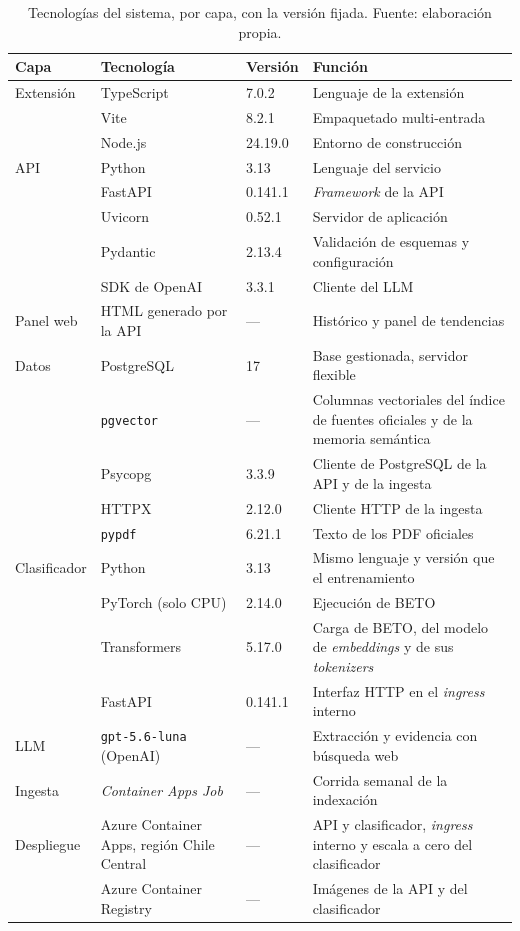 \begin{table}[t]
  \centering
  \small
  \caption{Tecnologías del sistema, por capa, con la versión fijada. Fuente: elaboración propia.}
  \label{tab:stack}
  \begin{tabular}{l l l p{4.5cm}}
    \hline
    \textbf{Capa} & \textbf{Tecnología} & \textbf{Versión} & \textbf{Función} \\
    \hline
    Extensión & TypeScript & 7.0.2 & Lenguaje de la extensión \\
              & Vite & 8.2.1 & Empaquetado multi-entrada \\
              & Node.js & 24.19.0 & Entorno de construcción \\
    API & Python & 3.13 & Lenguaje del servicio \\
        & FastAPI & 0.141.1 & \textit{Framework} de la API \\
        & Uvicorn & 0.52.1 & Servidor de aplicación \\
        & Pydantic & 2.13.4 & Validación de esquemas y configuración \\
        & SDK de OpenAI & 3.3.1 & Cliente del LLM \\
    Panel web & HTML generado por la API & --- & Histórico y panel de tendencias \\
    Datos & PostgreSQL & 17 & Base gestionada, servidor flexible \\
          & \texttt{pgvector} & --- & Columnas vectoriales del índice de fuentes oficiales y de la memoria semántica \\
          & Psycopg & 3.3.9 & Cliente de PostgreSQL de la API y de la ingesta \\
          & HTTPX & 2.12.0 & Cliente HTTP de la ingesta \\
          & \texttt{pypdf} & 6.21.1 & Texto de los PDF oficiales \\
    Clasificador & Python & 3.13 & Mismo lenguaje y versión que el entrenamiento \\
                 & PyTorch (solo CPU) & 2.14.0 & Ejecución de BETO \\
                 & Transformers & 5.17.0 & Carga de BETO, del modelo de \textit{embeddings} y de sus \textit{tokenizers} \\
                 & FastAPI & 0.141.1 & Interfaz HTTP en el \textit{ingress} interno \\
    LLM & \texttt{gpt-5.6-luna} (OpenAI) & --- & Extracción y evidencia con búsqueda web \\
    Ingesta & \textit{Container Apps Job} & --- & Corrida semanal de la indexación \\
    Despliegue & Azure Container Apps, región Chile Central & --- & API y clasificador, \textit{ingress} interno y escala a cero del clasificador \\
               & Azure Container Registry & --- & Imágenes de la API y del clasificador \\
    \hline
  \end{tabular}
\end{table}


